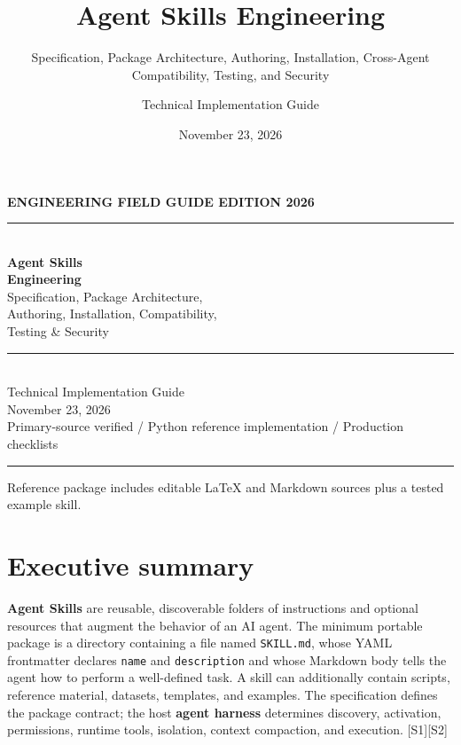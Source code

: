 \documentclass[
  10pt,
  letterpaper,
]{article}
\title{Agent Skills Engineering}
\subtitle{Specification, Package Architecture, Authoring, Installation,
Cross-Agent Compatibility, Testing, and Security}
\author{Technical Implementation Guide}
\date{November 23, 2026}
\newcommand{\passthrough}[1]{#1}
\begin{document}
\hypersetup{pageanchor=false}%
\begin{titlepage}
\raggedright
\setlength{\parindent}{0pt}
\thispagestyle{empty}
\vspace*{1.45in}
{\sffamily\bfseries\color{teal}\large ENGINEERING FIELD GUIDE \hfill EDITION 2026\\[0.28in]}
{\color{navy}\rule{\linewidth}{1.8pt}}\\[0.48in]
{\sffamily\bfseries\color{navy}\fontsize{34}{41}\selectfont Agent Skills\\[0.08in] Engineering}\\[0.42in]
{\sffamily\fontsize{17}{25}\selectfont Specification, Package Architecture,\\ Authoring, Installation, Compatibility,\\ Testing \& Security}\\[0.65in]
{\color{teal}\rule{0.42\textwidth}{1.4pt}}\\[0.37in]
{\sffamily\large Technical Implementation Guide}\\[0.2in]
{\sffamily\color{muted}\normalsize November 23, 2026}\\[0.55in]
{\sffamily\small\color{muted} Primary-source verified \quad / \quad Python reference implementation \quad / \quad Production checklists}\\
\vfill
{\color{navy}\rule{\textwidth}{0.7pt}}
{\sffamily\scriptsize\color{muted} Reference package includes editable LaTeX and Markdown sources plus a tested example skill.}
\end{titlepage}\hypersetup{pageanchor=true}
\clearpage


{
\setcounter{tocdepth}{2}
\tableofcontents\clearpage
}
\section{Executive summary}\label{executive-summary}

\textbf{Agent Skills} are reusable, discoverable folders of instructions
and optional resources that augment the behavior of an AI agent. The
minimum portable package is a directory containing a file named
\passthrough{\lstinline!SKILL.md!}, whose YAML frontmatter declares
\passthrough{\lstinline!name!} and \passthrough{\lstinline!description!}
and whose Markdown body tells the agent how to perform a well-defined
task. A skill can additionally contain scripts, reference material,
datasets, templates, and examples. The specification defines the package
contract; the host \textbf{agent harness} determines discovery,
activation, permissions, runtime tools, isolation, context compaction,
and execution. {[}S1{]}{[}S2{]}
\end{document}
